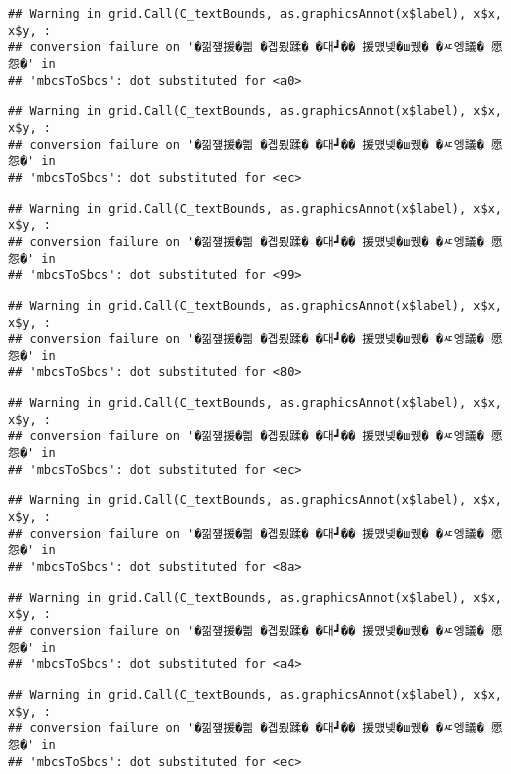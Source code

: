 \documentclass[
]{article}
\begin{document}
\begin{verbatim}
## Warning in grid.Call(C_textBounds, as.graphicsAnnot(x$label), x$x, x$y, :
## conversion failure on '�낆쟾援�쁾 �곕룄蹂� �대┛�� 援먰넻�ш퀬� �ㅼ엥議� 愿怨�' in
## 'mbcsToSbcs': dot substituted for <a0>
\end{verbatim}

\begin{verbatim}
## Warning in grid.Call(C_textBounds, as.graphicsAnnot(x$label), x$x, x$y, :
## conversion failure on '�낆쟾援�쁾 �곕룄蹂� �대┛�� 援먰넻�ш퀬� �ㅼ엥議� 愿怨�' in
## 'mbcsToSbcs': dot substituted for <ec>
\end{verbatim}

\begin{verbatim}
## Warning in grid.Call(C_textBounds, as.graphicsAnnot(x$label), x$x, x$y, :
## conversion failure on '�낆쟾援�쁾 �곕룄蹂� �대┛�� 援먰넻�ш퀬� �ㅼ엥議� 愿怨�' in
## 'mbcsToSbcs': dot substituted for <99>
\end{verbatim}

\begin{verbatim}
## Warning in grid.Call(C_textBounds, as.graphicsAnnot(x$label), x$x, x$y, :
## conversion failure on '�낆쟾援�쁾 �곕룄蹂� �대┛�� 援먰넻�ш퀬� �ㅼ엥議� 愿怨�' in
## 'mbcsToSbcs': dot substituted for <80>
\end{verbatim}

\begin{verbatim}
## Warning in grid.Call(C_textBounds, as.graphicsAnnot(x$label), x$x, x$y, :
## conversion failure on '�낆쟾援�쁾 �곕룄蹂� �대┛�� 援먰넻�ш퀬� �ㅼ엥議� 愿怨�' in
## 'mbcsToSbcs': dot substituted for <ec>
\end{verbatim}

\begin{verbatim}
## Warning in grid.Call(C_textBounds, as.graphicsAnnot(x$label), x$x, x$y, :
## conversion failure on '�낆쟾援�쁾 �곕룄蹂� �대┛�� 援먰넻�ш퀬� �ㅼ엥議� 愿怨�' in
## 'mbcsToSbcs': dot substituted for <8a>
\end{verbatim}

\begin{verbatim}
## Warning in grid.Call(C_textBounds, as.graphicsAnnot(x$label), x$x, x$y, :
## conversion failure on '�낆쟾援�쁾 �곕룄蹂� �대┛�� 援먰넻�ш퀬� �ㅼ엥議� 愿怨�' in
## 'mbcsToSbcs': dot substituted for <a4>
\end{verbatim}

\begin{verbatim}
## Warning in grid.Call(C_textBounds, as.graphicsAnnot(x$label), x$x, x$y, :
## conversion failure on '�낆쟾援�쁾 �곕룄蹂� �대┛�� 援먰넻�ш퀬� �ㅼ엥議� 愿怨�' in
## 'mbcsToSbcs': dot substituted for <ec>
\end{verbatim}
\end{document}
